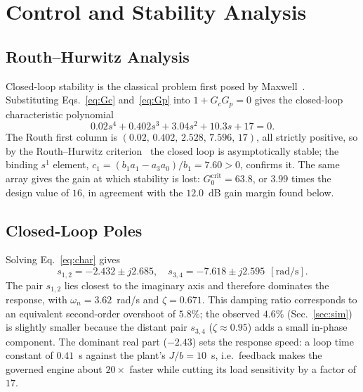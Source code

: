 \documentclass[conference]{IEEEtran}
\begin{document}
\section{Control and Stability Analysis}
\subsection{Routh--Hurwitz Analysis}
Closed-loop stability is the classical problem first posed by
Maxwell~\cite{maxwell}. Substituting Eqs.~\eqref{eq:Gc} and~\eqref{eq:Gp} into
$1+G_cG_p=0$ gives the closed-loop characteristic polynomial
\begin{equation}
0.02s^{4}+0.402s^{3}+3.04s^{2}+10.3s+17=0 .
\label{eq:char}
\end{equation}
The Routh first column is $(0.02,\,0.402,\,2.528,\,7.596,\,17)$, all strictly
positive, so by the Routh--Hurwitz criterion~\cite{nise} the closed loop is
asymptotically stable; the binding $s^{1}$ element,
$c_1=(b_1a_1-a_3a_0)/b_1=7.60>0$, confirms it. The same array gives the gain at
which stability is lost: $G_0^{\mathrm{crit}}=63.8$, or $3.99$ times the design
value of $16$, in agreement with the $12.0$~dB gain margin found below.

\subsection{Closed-Loop Poles}
Solving Eq.~\eqref{eq:char} gives
\begin{equation}
s_{1,2}=-2.432\pm j2.685,\quad s_{3,4}=-7.618\pm j2.595\ \ [\mathrm{rad/s}].
\label{eq:poles}
\end{equation}
The pair $s_{1,2}$ lies closest to the imaginary axis and therefore dominates the
response, with $\omega_n=3.62$~rad/s and $\zeta=0.671$. This damping ratio
corresponds to an equivalent second-order overshoot of $5.8\%$; the observed $4.6\%$
(Sec.~\ref{sec:sim}) is slightly smaller because the distant pair $s_{3,4}$
(\mbox{$\zeta\approx0.95$}) adds a small in-phase component. The dominant real part
($-2.43$) sets the response speed: a loop time constant of $0.41$~s against the
plant's $J/b=10$~s, i.e.\ feedback makes the governed engine about $20\times$ faster
while cutting its load sensitivity by a factor of $17$.
\end{document}
